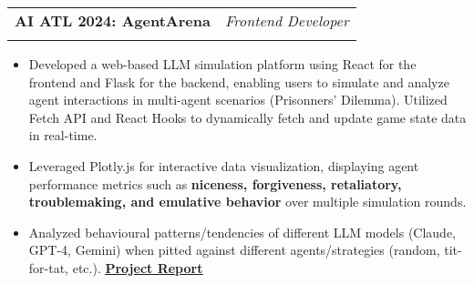 \documentclass[letterpaper,11pt]{article}
\makeatletter
\newcommand{\resumeItem}[1]{
  \item\small{
    {#1 \vspace{-2pt}}
  }
}
\newcommand{\resumeSubheading}[4]{
  \vspace{-2pt}\item
    \begin{tabular*}{0.97\textwidth}[t]{l@{\extracolsep{\fill}}r}
      \textbf{#1} & #2 \\
      \textit{\small#3} & \textit{\small #4} \\
    \end{tabular*}\vspace{-7pt}
}
\newcommand{\resumeItemListStart}{\begin{itemize}}
\newcommand{\resumeItemListEnd}{\end{itemize}\vspace{-8pt}}
\makeatother
\begin{document}
    \resumeSubheading
    {AI ATL 2024: AgentArena}{\textit{Frontend Developer}}
    {}{}
    \resumeItemListStart
    \vspace{-5mm}
      \resumeItem{Developed a web-based LLM simulation platform using React for the frontend and Flask for the backend, enabling users to simulate and analyze agent interactions in multi-agent scenarios (Prisonners' Dilemma). Utilized Fetch API and React Hooks to dynamically fetch and update game state data in real-time.}
      \resumeItem{Leveraged Plotly.js for interactive data visualization, displaying agent performance metrics such as \textbf{niceness, forgiveness, retaliatory, troublemaking, and emulative behavior} over multiple simulation rounds.}
      \resumeItem{Analyzed behavioural patterns/tendencies of different LLM models (Claude, GPT-4, Gemini) when pitted against different agents/strategies (random, tit-for-tat, etc.). \href{https://drive.google.com/file/d/1SQzdfGt7ht6lkvVI1J9FIJJ_4yjdPMzK/view?usp=sharing}{\textbf{\underline{Project Report}}}}
    \resumeItemListEnd


  
\end{document}

